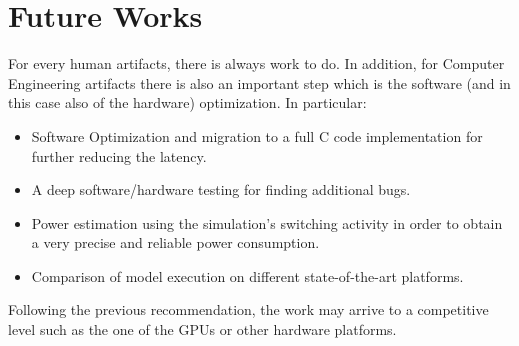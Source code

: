 \section{Future Works}
For every human artifacts, there is always work to do. In addition, for Computer Engineering artifacts there is also an important step which is the software (and in this case also of the hardware) optimization.
In particular:\\
\begin{itemize}
\item Software Optimization and migration to a full C code implementation for further reducing the latency.
\item A deep software/hardware testing for finding additional bugs.
\item Power estimation using the simulation’s switching activity in order to obtain a very precise and reliable power consumption.
\item Comparison of model execution on different state-of-the-art platforms.\\
\end{itemize}

Following the previous recommendation, the work may arrive to a competitive level such as the one of the GPUs or other hardware platforms.
